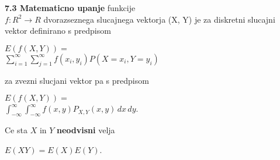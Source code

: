 \documentclass{article}
\begin{document}
\begin{multicols}{2}
\textbf{7.3 Matematicno upanje} funkcije\\
$f: R^2 \rightarrow R$ dvorazseznega slucajnega vektorja (X, Y) je 
za diskretni slucajni vektor definirano s predpisom
\begin{center}
    \begin{math}
        E(f(X,Y)) = 
    \end{math}\\
    \begin{math}
        \sum_{i=1}^{\infty}\sum_{j=1}^{\infty} f(x_i, y_i) P(X = x_i, Y = y_i)
    \end{math}
\end{center}
za zvezni slucjani vektor pa s predpisom
\begin{center}
    \begin{math}
        E(f(X,Y)) = 
    \end{math}\\
    \begin{math}
        \int_{-\infty}^{\infty}\int_{-\infty}^{\infty} f(x, y) P_{X,Y}(x,y)\,dx\,dy
    \end{math}.
\end{center}
Ce sta $X$ in $Y$ \textbf{neodvisni} velja
\begin{center}
    \begin{math}
        E(XY) = E(X)E(Y)
    \end{math}.
\end{center}


\end{multicols}
\end{document}
